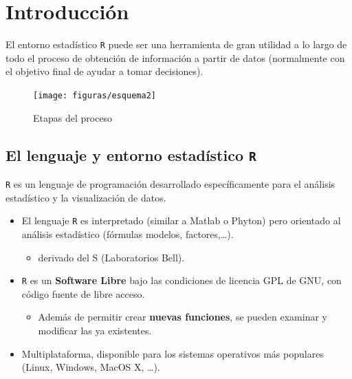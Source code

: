 \documentclass[
]{book}
\providecommand{\tightlist}{%
  \setlength{\itemsep}{0pt}\setlength{\parskip}{0pt}}
\theoremstyle{break}
\begin{document}
\hypertarget{introducciuxf3n}{%
\chapter{Introducción}\label{introducciuxf3n}}

El entorno estadístico \texttt{R} puede ser una herramienta de gran
utilidad a lo largo de todo el proceso de obtención de información
a partir de datos (normalmente con el objetivo final de ayudar a tomar decisiones).

\begin{figure}[!htb]

{\centering \texttt{[image: figuras/esquema2]} 

}

\caption{Etapas del proceso}\label{fig:esquema}
\end{figure}

\hypertarget{el-lenguaje-y-entorno-estaduxedstico-r}{%
\section{\texorpdfstring{El lenguaje y entorno estadístico \texttt{R}}{El lenguaje y entorno estadístico R}}\label{el-lenguaje-y-entorno-estaduxedstico-r}}

\texttt{R} es un lenguaje de programación desarrollado específicamente para el
análisis estadístico y la visualización de datos.

\begin{itemize}
\item
  El lenguaje \texttt{R} es interpretado (similar a Matlab o Phyton) pero orientado al
  análisis estadístico (fórmulas modelos, factores,\ldots).

  \begin{itemize}
  \tightlist
  \item
    derivado del S (Laboratorios Bell).
  \end{itemize}
\item
  \texttt{R} es un \textbf{Software Libre} bajo las condiciones de licencia GPL de
  GNU, con código fuente de libre acceso.

  \begin{itemize}
  \tightlist
  \item
    Además de permitir crear \textbf{nuevas funciones},
    se pueden examinar y modificar las ya existentes.
  \end{itemize}
\item
  Multiplataforma,
  disponible para los sistemas operativos más populares (Linux, Windows, MacOS X, \ldots).
\end{itemize}
\end{document}
